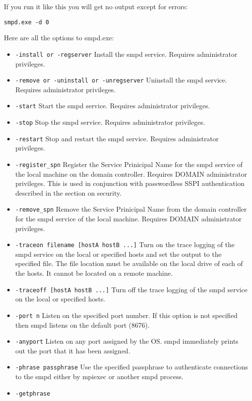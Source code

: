 \documentclass[dvipdfm,11pt]{article}
\begin{document}
If you run it like this you will get no output except for errors:
\begin{verbatim}
smpd.exe -d 0
\end{verbatim}

Here are all the options to smpd.exe:
\begin{itemize}
\item \texttt{-install or -regserver}
Install the smpd service.  Requires administrator privileges.
\item \texttt{-remove or -uninstall or -unregserver}
Uninstall the smpd service.  Requires administrator privileges.
\item \texttt{-start}
Start the smpd service.  Requires administrator privileges.
\item \texttt{-stop}
Stop the smpd service.  Requires administrator privileges.
\item \texttt{-restart}
Stop and restart the smpd service.  Requires administrator privileges.
\item \texttt{-register\_spn}
Register the Service Prinicipal Name for the smpd service of the local machine
on the domain controller.  Requires DOMAIN administrator privileges.  This is
used in conjunction with passwordless SSPI authentication described in the
section on security.
\item \texttt{-remove\_spn}
Remove the Service Prinicipal Name from the domain controller for the smpd service
of the local machine.  Requires DOMAIN administrator privileges.
\item \texttt{-traceon filename [hostA hostB ...]}
Turn on the trace logging of the smpd service on the local or specified hosts
and set the output to the specified file.  The file location must be available
on the local drive of each of the hosts.  It cannot be located on a remote 
machine.
\item \texttt{-traceoff [hostA hostB ...]}
Turn off the trace logging of the smpd service on the local or specified hosts.
\item \texttt{-port n}
Listen on the specified port number.  If this option is not specified then smpd
listens on the default port (8676).
\item \texttt{-anyport}
Listen on any port assigned by the OS.  smpd immediately prints out the port that
it has been assigned.
\item \texttt{-phrase passphrase}
Use the specified passphrase to authenticate connections to the smpd either by
mpiexec or another smpd process.
\item \texttt{-getphrase}

\end{itemize}
\end{document}
